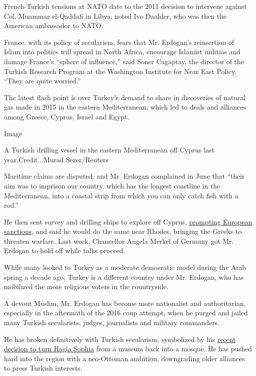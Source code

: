 French-Turkish tensions at NATO date to the 2011 decision to intervene
against Col. Muammar el-Qaddafi in Libya, noted Ivo Daalder, who was
then the American ambassador to NATO.

France, with its policy of secularism, fears that Mr. Erdogan's
reinsertion of Islam into politics will spread in North Africa,
encourage Islamist militias and damage France's ``sphere of influence,''
said Soner Cagaptay, the director of the Turkish Research Program at the
Washington Institute for Near East Policy. ``They are quite worried.''

The latest flash point is over Turkey's demand to share in discoveries
of natural gas made in 2015 in the eastern Mediterranean, which led to
deals and alliances among Greece, Cyprus, Israel and Egypt.

Image

A Turkish drilling vessel in the eastern Mediterranean off Cyprus last
year.Credit...Murad Sezer/Reuters

Maritime claims are disputed, and Mr. Erdogan complained in June that
``their aim was to imprison our country, which has the longest coastline
in the Mediterranean, into a coastal strip from which you can only catch
fish with a rod.''

He then sent survey and drilling ships to explore off Cyprus,
\href{https://www.nytimes3xbfgragh.onion/2019/07/15/world/europe/eu-turkey-cyprus.html}{prompting
European sanctions}, and said he would do the same near Rhodes, bringing
the Greeks to threaten warfare. Last week, Chancellor Angela Merkel of
Germany got Mr. Erdogan to hold off while talks proceed.

While many looked to Turkey as a moderate democratic model during the
Arab spring a decade ago, Turkey is a different country under Mr.
Erdogan, who has mobilized the more religious voters in the countryside.

A devout Muslim, Mr. Erdogan has become more nationalist and
authoritarian, especially in the aftermath of the 2016 coup attempt,
when he purged and jailed many Turkish secularists, judges, journalists
and military commanders.

He has broken definitively with Turkish secularism, symbolized by his
\href{https://www.nytimes3xbfgragh.onion/2020/07/24/world/europe/turkey-hagia-sophia-mosque-prayers.html?searchResultPosition=3}{recent
decision to turn Hagia Sophia} from a museum back into a mosque. He has
pushed hard into the region with a neo-Ottoman ambition, downgrading
older alliances to press Turkish interests.

